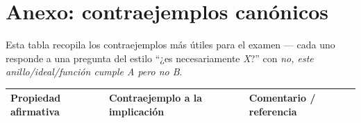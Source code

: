 \documentclass[11pt,twoside]{article}
\begin{document}
\newpage
\section{Anexo: contraejemplos canónicos}

Esta tabla recopila los contraejemplos más útiles para el examen --- cada uno responde a una pregunta del estilo ``¿es necesariamente \textit{X}?'' con \textit{no, este anillo/ideal/función cumple A pero no B}.

\renewcommand{\arraystretch}{1.35}
\begin{longtable}{p{} p{} p{}}
\hline
\textbf{Propiedad afirmativa} & \textbf{Contraejemplo a la implicación} & \textbf{Comentario / referencia} \\
\hline
\endhead


\end{longtable}
\end{document}
